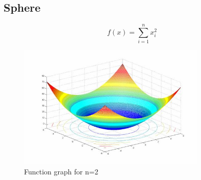 \documentclass{article}
\begin{document}
\subsection{Sphere}

{\Large %
\[
f(x) = \sum_{i=1}^{n} x_i^2                         
\]

\begin{figure}[h!]
    \centering
    \includegraphics[width=0.8\textwidth]{sphere.jpg} 
    \caption{Function graph for n=2 \cite{Sphere}}
    \label{fig:rastrigin-image}
\end{figure}

}
\end{document}

